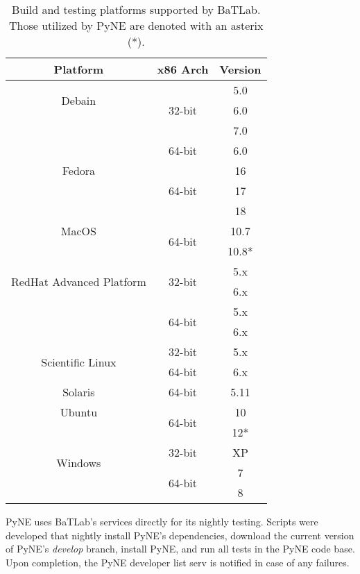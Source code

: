\documentclass{anstrans}
\begin{document}
\begin{table}[ht]
  \begin{center}
    \caption{\label{tab::batlab}Build and testing platforms supported by BaTLab. 
      Those utilized by PyNE are denoted with an asterix (*).}
    \begin{tabular}{|c|c|c|}
    \hline
    Platform & x86 Arch & Version \\
    \hline
    \multirow{2}{*}{Debain} 
    & \multirow{3}{*}{32-bit} & 5.0 \\ & & 6.0 \\ & & 7.0 \\ 
    \cline{2-3}
    & \multirow{1}{*}{64-bit} & 6.0 \\
    \hline
    \multirow{1}{*}{Fedora} 
    & \multirow{3}{*}{64-bit} & 16 \\ & & 17 \\ & & 18 \\
    \hline
    \multirow{1}{*}{MacOS} 
    & \multirow{2}{*}{64-bit} & 10.7 \\ & & 10.8* \\
    \hline
    \multirow{2}{*}{RedHat Advanced Platform} 
    & \multirow{2}{*}{32-bit} & 5.x \\ & & 6.x \\ 
    \cline{2-3}
    & \multirow{2}{*}{64-bit} & 5.x \\ & & 6.x \\
    \hline
    \multirow{2}{*}{Scientific Linux} 
    & \multirow{1}{*}{32-bit} & 5.x \\ 
    \cline{2-3}
    & \multirow{1}{*}{64-bit} & 6.x \\
    \hline
    \multirow{1}{*}{Solaris} 
    & \multirow{1}{*}{64-bit} & 5.11 \\
    \hline
    \multirow{1}{*}{Ubuntu} 
    & \multirow{2}{*}{64-bit} & 10 \\ & & 12* \\
    \hline
    \multirow{2}{*}{Windows} 
    & \multirow{1}{*}{32-bit} & XP \\ 
    \cline{2-3}
    & \multirow{2}{*}{64-bit} & 7 \\ & & 8 \\
    \hline
    \end{tabular}
  \end{center}
\end{table}

PyNE uses BaTLab's services directly for its nightly testing. Scripts were
developed that nightly install PyNE's dependencies, download the current version
of PyNE's \textit{develop} branch, install PyNE, and run all tests in the PyNE
code base. Upon completion, the PyNE developer list serv is notified in case of
any failures.
\end{document}
